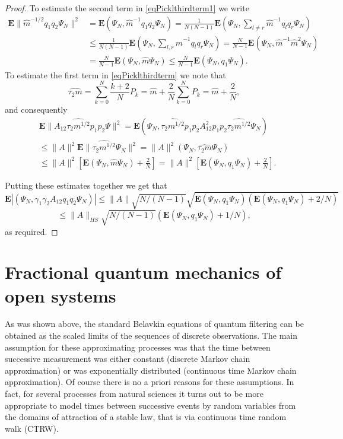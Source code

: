 \documentclass[12pt]{article}
\def\E{\mathbf{E}}
\def\ga{\gamma}
\begin{document}
\begin{proof}
To estimate the second term in \eqref{eqPicklthirdterm1} we write
\[
\begin{aligned}
\E \| \hat m^{-1/2} q_1q_2\Psi_N\|^2 & =\E (\Psi_N, \hat m^{-1} q_1q_2\Psi_N)
 =\frac{1}{N(N-1)} \E (\Psi_N, \sum_{l\neq r} \hat m^{-1} q_lq_r\Psi_N) \\
& \le \frac{1}{N(N-1)} \E (\Psi_N, \sum_{l,r} \hat m^{-1} q_lq_r\Psi_N)
 =\frac{N}{N-1} \E (\Psi_N, \hat m^{-1} \hat m^2 \Psi_N) \\
& =\frac{N}{N-1} \E (\Psi_N, \hat m \Psi_N)
\le \frac{N}{N-1} \E  (\Psi_N, q_1 \Psi_N).
\end{aligned}
 \]
 To estimate the first term in \eqref{eqPicklthirdterm} we note that
 \[
\widehat{\tau_2m}=\sum_{k=0}^N\frac{k+2}{N} P_k
=\hat m +\frac{2}{N} \sum_{k=0}^NP_k=\hat m +\frac{2}{N},
\]
and consequently
\[
\begin{aligned}
& \E \|A_{12}  \widehat{\tau_2m^{1/2}} p_1p_2 \Psi\|^2
=\E (\Psi_N,  \widehat{\tau_2m^{1/2}} p_1 p_2 A_{12}^2  p_1 p_2 \widehat{\tau_2m^{1/2}} \Psi_N) \\
& \le \|A\|^2 \E \|\widehat{\tau_2m^{1/2}} \Psi_N\|^2
=\|A\|^2 (\Psi_N, \widehat{\tau_2m} \Psi_N) \\
&\le \|A\|^2 \left[\E (\Psi_N, \hat m \Psi_N) +\frac{2}{N}\right]
=\|A\|^2 \left[\E (\Psi_N, q_1 \Psi_N) +\frac{2}{N}\right].
\end{aligned}
\]

Putting these estimates together we get that
\[
\E |(\Psi_N, \ga_1\ga_2A_{12} q_1 q_2\Psi_N)|
\le \|A\| \sqrt{N/(N-1)} \sqrt{\E (\Psi_N, q_1 \Psi_N)(\E (\Psi_N, q_1 \Psi_N) +2/N)}
\]
\[
\le  \|A\|_{HS} \sqrt{N/(N-1)} (\E (\Psi_N, q_1 \Psi_N) +1/N),
\]
as required.
\end{proof}

\section{Fractional quantum mechanics of open systems}
\label{secfraceq}

As was shown above, the standard Belavkin equations of quantum filtering can be obtained as the scaled limits of
the sequences of discrete observations. The main assumption for these approximating processes was that the time
between successive measurement was either constant (discrete Markov chain approximation) or was exponentially distributed
(continuous time Markov chain approximation). Of course there is no a priori reasons for these assumptions.
 In fact, for several processes from natural sciences it turns out to be more appropriate to model times between successive
 events by random variables from the domains of attraction of a stable law, that is via continuous time random walk (CTRW).
\end{document}
